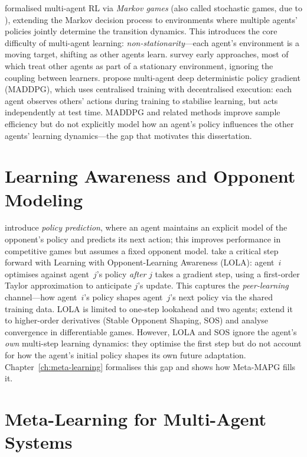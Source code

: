 \citet{littman1994} formalised multi-agent RL via \emph{Markov games} (also called stochastic games, due to \citet{shapley1953}), extending the Markov decision process to environments where multiple agents' policies jointly determine the transition dynamics. This introduces the core difficulty of multi-agent learning: \emph{non-stationarity}---each agent's environment is a moving target, shifting as other agents learn. \citet{busoniu2008} survey early approaches, most of which treat other agents as part of a stationary environment, ignoring the coupling between learners. \citet{lowe2017} propose multi-agent deep deterministic policy gradient (MADDPG), which uses centralised training with decentralised execution: each agent observes others' actions during training to stabilise learning, but acts independently at test time. MADDPG and related methods improve sample efficiency but do not explicitly model how an agent's policy influences the other agents' learning dynamics---the gap that motivates this dissertation.

\section{Learning Awareness and Opponent Modeling}
\label{sec:lit-opponent-modeling}

\citet{zhang2010} introduce \emph{policy prediction}, where an agent maintains an explicit model of the opponent's policy and predicts its next action; this improves performance in competitive games but assumes a fixed opponent model. \citet{foerster2018lola} take a critical step forward with Learning with Opponent-Learning Awareness (LOLA): agent~$i$ optimises against agent~$j$'s policy \emph{after} $j$ takes a gradient step, using a first-order Taylor approximation to anticipate $j$'s update. This captures the \emph{peer-learning} channel---how agent~$i$'s policy shapes agent~$j$'s next policy via the shared training data. LOLA is limited to one-step lookahead and two agents; \citet{letcher2019} extend it to higher-order derivatives (Stable Opponent Shaping, SOS) and analyse convergence in differentiable games. However, LOLA and SOS ignore the agent's \emph{own} multi-step learning dynamics: they optimise the first step but do not account for how the agent's initial policy shapes its own future adaptation. Chapter~\ref{ch:meta-learning} formalises this gap and shows how Meta-MAPG fills it.

\section{Meta-Learning for Multi-Agent Systems}
\label{sec:lit-meta-learning}

